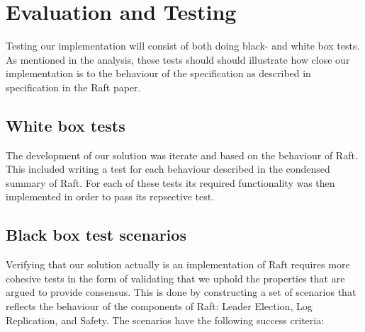 \section{Evaluation and Testing} %
\label{sec:evaluation_and_testing}
Testing our implementation will consist of both doing black- and white box tests. As mentioned in the analysis, these tests should should illustrate how close our implementation is to the behaviour of the specification as described in specification in the Raft\cite{Raft} paper.


\subsection{White box tests}
The development of our solution was iterate and based on the behaviour of Raft. This included writing a test for each behaviour described in the condensed summary of Raft\cite{Raft}. For each of these tests its required functionality was then implemented in order to pass its repsective test. 


\subsection{Black box test scenarios}
Verifying that our solution actually is an implementation of Raft requires more cohesive tests in the form of validating that we uphold the properties that are argued to provide consensus. This is done by constructing a set of scenarios that reflects the behaviour of the components of Raft: Leader Election, Log Replication, and Safety. The scenarios have the following success criteria:

